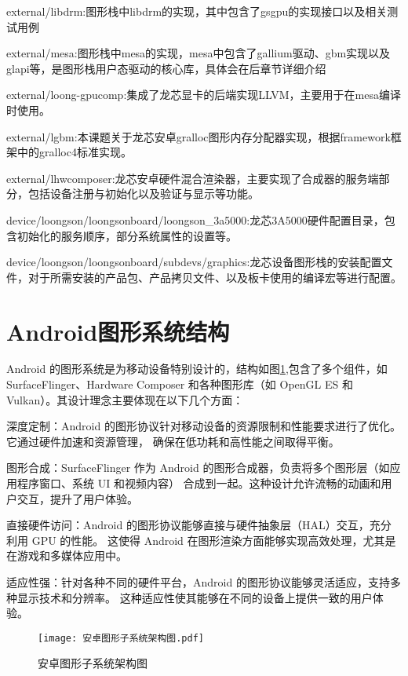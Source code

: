   external/libdrm:图形栈中libdrm的实现，其中包含了gsgpu的实现接口以及相关测试用例

  external/mesa:图形栈中mesa的实现，mesa中包含了gallium驱动、gbm实现以及glapi等，是图形栈用户态驱动的核心库，具体会在后章节详细介绍

  external/loong-gpucomp:集成了龙芯显卡的后端实现LLVM，主要用于在mesa编译时使用。

  external/lgbm:本课题关于龙芯安卓gralloc图形内存分配器实现，根据framework框架中的gralloc4标准实现。

  external/lhwcomposer:龙芯安卓硬件混合渲染器，主要实现了合成器的服务端部分，包括设备注册与初始化以及验证与显示等功能。

  device/loongson/loongsonboard/loongson\_3a5000:龙芯3A5000硬件配置目录，包含初始化的服务顺序，部分系统属性的设置等。

  device/loongson/loongsonboard/subdevs/graphics:龙芯设备图形栈的安装配置文件，对于所需安装的产品包、产品拷贝文件、以及板卡使用的编译宏等进行配置。

\section{Android图形系统结构}\label{sec:Android图形系统结构}
Android 的图形系统是为移动设备特别设计的，结构如图\ref{fig:安卓图形子系统架构图},包含了多个组件，如 SurfaceFlinger、Hardware Composer 
和各种图形库（如 OpenGL ES 和 Vulkan）。其设计理念主要体现在以下几个方面：

深度定制：Android 的图形协议针对移动设备的资源限制和性能要求进行了优化。它通过硬件加速和资源管理，
确保在低功耗和高性能之间取得平衡。

图形合成：SurfaceFlinger 作为 Android 的图形合成器，负责将多个图形层（如应用程序窗口、系统 UI 和视频内容）
合成到一起。这种设计允许流畅的动画和用户交互，提升了用户体验。

直接硬件访问：Android 的图形协议能够直接与硬件抽象层（HAL）交互，充分利用 GPU 的性能。
这使得 Android 在图形渲染方面能够实现高效处理，尤其是在游戏和多媒体应用中。

适应性强：针对各种不同的硬件平台，Android 的图形协议能够灵活适应，支持多种显示技术和分辨率。
这种适应性使其能够在不同的设备上提供一致的用户体验。

\begin{figure}[h]
  \centering
  \texttt{[image: 安卓图形子系统架构图.pdf]}
  \caption{安卓图形子系统架构图}\label{fig:安卓图形子系统架构图}
\end{figure}

